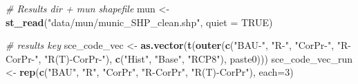 \documentclass[
]{article}
\newenvironment{Shaded}{\begin{snugshade}}{\end{snugshade}}
\newcommand{\CommentTok}[1]{\textcolor[rgb]{0.56,0.35,0.01}{\textit{#1}}}
\newcommand{\DataTypeTok}[1]{\textcolor[rgb]{0.13,0.29,0.53}{#1}}
\newcommand{\DecValTok}[1]{\textcolor[rgb]{0.00,0.00,0.81}{#1}}
\newcommand{\KeywordTok}[1]{\textcolor[rgb]{0.13,0.29,0.53}{\textbf{#1}}}
\newcommand{\NormalTok}[1]{#1}
\newcommand{\OtherTok}[1]{\textcolor[rgb]{0.56,0.35,0.01}{#1}}
\newcommand{\StringTok}[1]{\textcolor[rgb]{0.31,0.60,0.02}{#1}}
\begin{document}
\begin{Shaded}
\begin{Highlighting}[]
\CommentTok{# Results dir + mun shapefile}
\NormalTok{mun <-}\StringTok{ }\KeywordTok{st_read}\NormalTok{(}\StringTok{"data/mun/munic_SHP_clean.shp"}\NormalTok{, }\DataTypeTok{quiet =} \OtherTok{TRUE}\NormalTok{)}

\CommentTok{# results key}
\NormalTok{sce_code_vec <-}\StringTok{ }
\StringTok{  }\KeywordTok{as.vector}\NormalTok{(}\KeywordTok{t}\NormalTok{(}\KeywordTok{outer}\NormalTok{(}\KeywordTok{c}\NormalTok{(}\StringTok{"BAU-"}\NormalTok{, }\StringTok{"R-"}\NormalTok{, }\StringTok{"CorPr-"}\NormalTok{, }\StringTok{"R-CorPr-"}\NormalTok{, }\StringTok{"R(T)-CorPr-"}\NormalTok{), }
                    \KeywordTok{c}\NormalTok{(}\StringTok{"Hist"}\NormalTok{, }\StringTok{"Base"}\NormalTok{, }\StringTok{"RCP8"}\NormalTok{), paste0)))}
\NormalTok{sce_code_vec_run <-}\StringTok{ }
\StringTok{  }\KeywordTok{rep}\NormalTok{(}\KeywordTok{c}\NormalTok{(}\StringTok{"BAU"}\NormalTok{, }\StringTok{"R"}\NormalTok{, }\StringTok{"CorPr"}\NormalTok{, }\StringTok{"R-CorPr"}\NormalTok{, }\StringTok{"R(T)-CorPr"}\NormalTok{), }\DataTypeTok{each=}\DecValTok{3}\NormalTok{)}


\end{Highlighting}
\end{Shaded}
\end{document}
